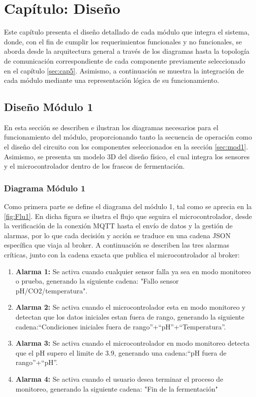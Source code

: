 \section{Capítulo: Diseño}

Este capítulo presenta el diseño detallado de cada módulo que integra el sistema, donde, 
con el fin de cumplir los requerimientos funcionales y no funcionales, se aborda desde
la arquitectura general a través de los diagramas hasta la topología de comunicación 
correspondiente de cada componente previamente seleccionado en el capítulo \ref{sec:cap5}. 
Asimismo, a continuación se muestra la integración de cada módulo mediante una representación 
lógica de su funcionamiento.

\subsection{Diseño Módulo 1}
En esta sección se describen e ilustran los diagramas necesarios para el funcionamiento del módulo, 
proporcionando tanto la secuencia de operación como el diseño del circuito con los componentes seleccionados 
en la sección \ref{sec:mod1}. Asimismo, se presenta un modelo 3D del diseño físico, el cual integra los sensores y 
el microcontrolador dentro de los frascos de fermentación.

\subsubsection{Diagrama Módulo 1}
Como primera parte se define el diagrama del módulo 1, tal como se aprecia en la \cref{fig:Flu1}.  
En dicha figura se ilustra el flujo que seguira el microcontrolador, desde la verificación de la conexión MQTT 
hasta el envío de datos y la gestión de alarmas, por lo que cada decisión y acción se traduce en una cadena JSON 
específica que viaja al broker.  
A continuación se describen las tres alarmas críticas, junto con la cadena exacta que publica el microcontrolador al broker:

\begin{enumerate}
    \item \textbf{Alarma 1:} Se activa cuando cualquier sensor falla ya sea en modo monitoreo o prueba, generando la siguiente cadena: "Fallo sensor pH/CO2/temperatura".
    \item \textbf{Alarma 2:} Se activa cuando el microcontrolador esta en modo monitoreo y detectan que los datos iniciales estan fuera de rango, generando la siguiente cadena:``Condiciones iniciales fuera de rango''+``pH''+``Temperatura''.
    \item \textbf{Alarma 3:} Se activa cuando el microcontrolador en modo monitoreo detecta que el pH supero el limite de 3.9, generando una cadena:``pH fuera de rango''+``pH''.
    \item \textbf{Alarma 4:} Se activa cuando el usuario desea terminar el proceso de monitoreo, generando la siguiente cadena: "Fin de la fermentación"
\end{enumerate}

